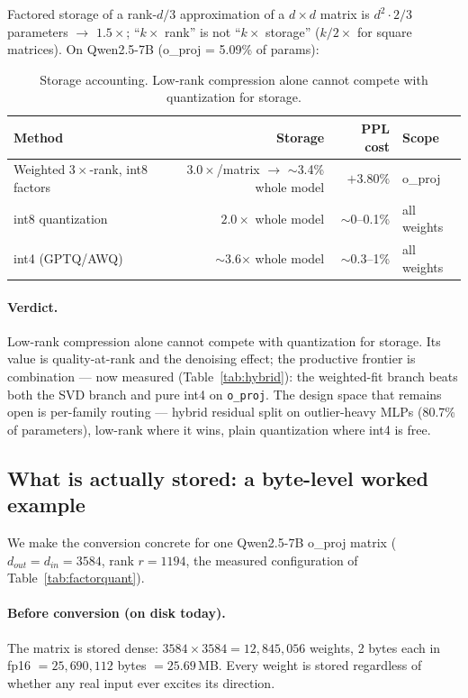 \documentclass[11pt]{article}
\begin{document}
Factored storage of a rank-$d/3$ approximation of a $d\times d$ matrix is
$d^2 \cdot 2/3$ parameters $\to$ $1.5\times$; ``$k\times$ rank'' is not
``$k\times$ storage'' ($k/2\times$ for square matrices). On Qwen2.5-7B
(o\_proj = 5.09\% of params):

\begin{table}[h]
\centering
\begin{tabular}{lrrl}
\toprule
Method & Storage & PPL cost & Scope \\
\midrule
Weighted $3\times$-rank, int8 factors & $3.0\times$/matrix $\to$ $\sim$3.4\% whole model & $+3.80\%$ & o\_proj \\
int8 quantization                     & $2.0\times$ whole model & $\sim$0--0.1\% & all weights \\
int4 (GPTQ/AWQ)                       & $\sim$3.6$\times$ whole model & $\sim$0.3--1\% & all weights \\
\bottomrule
\end{tabular}
\caption{Storage accounting. Low-rank compression alone cannot compete with
quantization for storage.}
\label{tab:storage}
\end{table}

\paragraph{Verdict.} Low-rank compression alone cannot compete with
quantization for storage. Its value is quality-at-rank and the denoising
effect; the productive frontier is combination --- now measured
(Table~\ref{tab:hybrid}): the weighted-fit branch beats both the SVD branch
and pure int4 on \texttt{o\_proj}. The design space that remains open is
per-family routing --- hybrid residual split on outlier-heavy MLPs (80.7\%
of parameters), low-rank where it wins, plain quantization where int4 is
free.

\subsection{What is actually stored: a byte-level worked example}\label{sec:bytes}

We make the conversion concrete for one Qwen2.5-7B o\_proj matrix
($d_{out} = d_{in} = 3584$, rank $r = 1194$, the measured configuration of
Table~\ref{tab:factorquant}).

\paragraph{Before conversion (on disk today).} The matrix is stored dense:
$3584 \times 3584 = 12{,}845{,}056$ weights, 2 bytes each in fp16
$= 25{,}690{,}112$ bytes $= 25.69$\,MB. Every weight is stored regardless of
whether any real input ever excites its direction.
\end{document}
